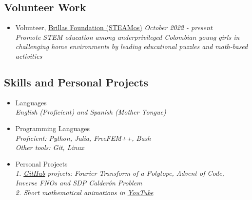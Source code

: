 \documentclass{article}
\begin{document}
\subsection*{Volunteer Work}
\begin{itemize}
\item Volunteer, \href{https://fundacionbrillas.org/equipo-brillas/}{\textcolor{myblue}{Brillas Foundation (STEAMos)}} \hfill \emph{October 2022 - present}\\
\textit{Promote STEM education among underprivileged Colombian young girls in challenging home environments by leading educational puzzles and math-based activities}
\end{itemize}
\subsection*{Skills and Personal Projects}
\begin{itemize}
\item Languages\\
\textit{English (Proficient) and Spanish (Mother Tongue)}
\end{itemize}
\begin{itemize}
\item Programming Languages\\
\textit{Proficient: Python, Julia, FreeFEM++, Bash}\\
\textit{Other tools: Git, Linux}
\item Personal Projects\\
\textit{1. \href{https://github.com/jcvillaquira}{\textcolor{myblue}{GitHub}} projects: Fourier Transform of a Polytope, Advent of Code, \\\phantom{1. GitHub projects:} Inverse FNOs and SDP Calder\'on Problem} \\
\textit{2. Short mathematical animations in \href{https://youtube.com/playlist?list=PLHC6SvaZRAH0yyFmcki1mCYxNRALuUGIF&si=VqjWf0U498asFg3r}{\textcolor{myblue}{YouTube}}}\\
\end{itemize}
\end{document}
